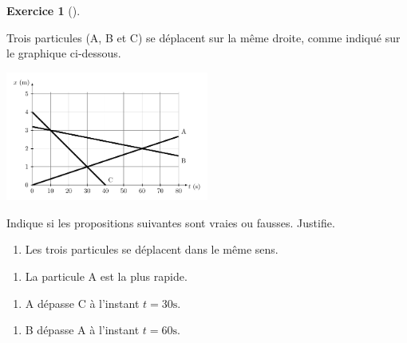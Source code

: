 \documentclass[
  letterpaper,
  DIV=11,
  numbers=noendperiod]{scrartcl}
\providecommand{\tightlist}{%
  \setlength{\itemsep}{0pt}\setlength{\parskip}{0pt}}\usepackage{longtable,booktabs,array}
\theoremstyle{definition}
\theoremstyle{definition}
\newtheorem{exercise}{Exercice}[section]
\theoremstyle{remark}
\begin{document}
\begin{exercise}[]\protect\hypertarget{exr-croisement}{}\label{exr-croisement}

Trois particules (A, B et C) se déplacent sur la même droite, comme
indiqué sur le graphique ci-dessous.

\begin{center}
\includegraphics[width=0.5\textwidth,height=\textheight]{figures/mru/fig11.pdf}
\end{center}

Indique si les propositions suivantes sont vraies ou fausses. Justifie.

\begin{enumerate}
\def\labelenumi{\arabic{enumi}.}
\tightlist
\item
  Les trois particules se déplacent dans le même sens.
\end{enumerate}

\vspace{2cm}

\begin{enumerate}
\def\labelenumi{\arabic{enumi}.}
\setcounter{enumi}{1}
\tightlist
\item
  La particule A est la plus rapide.
\end{enumerate}

\vspace{2cm}

\begin{enumerate}
\def\labelenumi{\arabic{enumi}.}
\setcounter{enumi}{2}
\tightlist
\item
  A dépasse C à l'instant \(t=30\text{s}\).
\end{enumerate}

\vspace{2cm}

\begin{enumerate}
\def\labelenumi{\arabic{enumi}.}
\setcounter{enumi}{3}
\tightlist
\item
  B dépasse A à l'instant \(t=60\text{s}\).
\end{enumerate}

\vspace{2cm}


\end{exercise}
\end{document}
